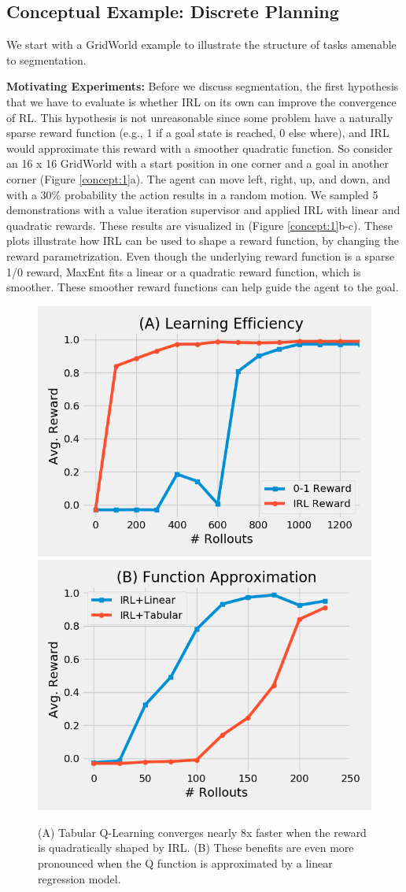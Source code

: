 \subsection{Conceptual Example: Discrete Planning}
We start with a GridWorld example to illustrate the structure of tasks amenable to segmentation. 

\vspace{0.5em} \noindent \textbf{Motivating Experiments: } Before we discuss segmentation, the first hypothesis that we have to evaluate is whether IRL on its own can improve the convergence of RL. This hypothesis is not unreasonable since some problem have a naturally sparse reward function (e.g., 1 if a goal state is reached, 0 else where), and IRL would approximate this reward with a smoother quadratic function. So consider an 16 x 16 GridWorld with a start position in one corner and a goal in another corner (Figure \ref{concept:1}a). 
The agent can move left, right, up, and down, and with a 30\% probability the action results in a random motion.
We sampled 5 demonstrations with a value iteration supervisor and applied IRL with linear and quadratic rewards. These results are visualized in (Figure \ref{concept:1}b-c).
These plots illustrate how IRL can be used to shape a reward function, by changing the reward parametrization. Even though the underlying reward function is a sparse 1/0 reward,  MaxEnt fits a linear or a quadratic reward function, which is smoother. These smoother reward functions can help guide the agent to the goal.

\begin{figure}[t]
\centering
 \includegraphics[width=0.48\columnwidth]{concept/1.png}
  \includegraphics[width=0.48\columnwidth]{concept/2.png}
 \caption{(A) Tabular Q-Learning converges nearly 8x faster when the reward is quadratically shaped by IRL. (B) These benefits are even more pronounced when the Q function is approximated by a linear regression model. \label{concept:2}}
\end{figure}

